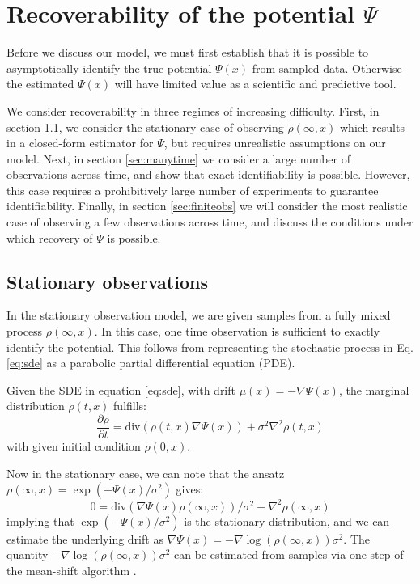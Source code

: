 \documentclass{article}
\begin{document}
\section{Recoverability of the potential $\Psi$}\label{sec:ident}

Before we discuss our model, we must first establish that it is possible to asymptotically identify the true potential $\Psi(x)$ from sampled data. Otherwise the estimated $\Psi(x)$ will have limited value as a scientific and predictive tool.

We consider recoverability in three regimes of increasing difficulty. First, in section \ref{sec:stationary}, we consider the stationary case of observing $\rho(\infty,x)$ which results in a closed-form estimator for $\Psi$, but requires unrealistic assumptions on our model. Next, in section \ref{sec:manytime} we consider a large number of observations across time, and show that exact identifiability is possible. However, this case requires a prohibitively large number of experiments to guarantee identifiability. Finally, in section \ref{sec:finiteobs} we will consider the most realistic case of observing a few observations across time, and discuss the conditions under which recovery of $\Psi$ is possible.

\subsection{Stationary observations}\label{sec:stationary}

In the stationary observation model, we are given samples from a fully mixed process $\rho(\infty,x)$. In this case, one time observation is sufficient to exactly identify the potential.
This follows from representing the stochastic process in Eq. \ref{eq:sde} as a parabolic partial differential equation (PDE).
\begin{thm}
Given the SDE in equation \ref{eq:sde}, with drift $\mu(x) = -\nabla\Psi(x)$, the marginal distribution $\rho(t,x)$ fulfills:
\begin{equation}\label{eq:fp}
\frac{\partial \rho}{\partial t} = \text{div}(\rho(t,x)\nabla \Psi(x)) + \sigma^2\nabla^2 \rho(t,x)
\end{equation}
with given initial condition $\rho(0,x)$.
\end{thm}

Now in the stationary case, we can note that the ansatz $\rho(\infty,x) = \exp(-\Psi(x)/\sigma^2)$ gives:
\[ 0 = \text{div}(\nabla \Psi(x) \rho(\infty,x))/\sigma^2 + \nabla^2 \rho(\infty,x)\]
implying that $\exp(-\Psi(x)/\sigma^2)$ is the stationary distribution, and we can estimate the underlying drift as $\nabla\Psi(x) = -\nabla \log(\rho(\infty,x))\sigma^2$. The quantity $-\nabla \log(\rho(\infty,x))\sigma^2$ can be estimated from samples via one step of the mean-shift algorithm \citep[Eq. 41]{fukunaga1975estimation}.
\end{document}
